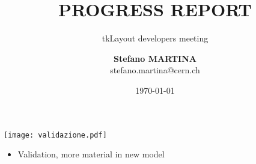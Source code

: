 \documentclass[pdftex, 11pt]{beamer}
\title[Progress report]{\textbf{PROGRESS REPORT}}
\subtitle{tkLayout developers meeting}
\institute[CERN]{
  European Organization for Nuclear Research\\[0.5cm]
  \texttt{[image: img/LogoBadge.pdf]}\\
}
\author[Stefano Martina]{
  \textbf{Stefano MARTINA}\\
  {\small stefano.martina@cern.ch}
}
\date[\today]{\flushright \today}
\begin{document}
\begin{frame}
  \titlepage
\end{frame}

\begin{frame}
  \begin{center}
    \texttt{[image: validazione.pdf]}
  \end{center}

  \begin{itemize}
  \item Validation, more material in new model
  \end{itemize}
\end{frame}
\end{document}
